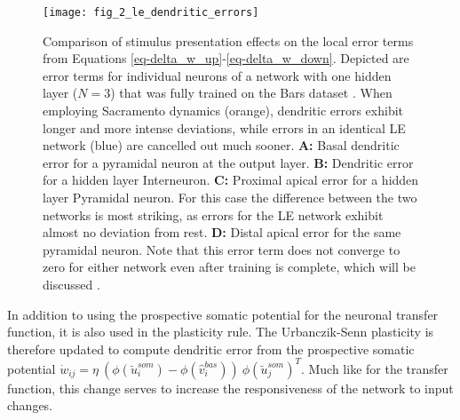 \begin{figure}
  \centering
  \texttt{[image: fig\_2\_le\_dendritic\_errors]}
  \caption{Comparison of stimulus presentation effects on the local error terms from Equations
    \ref{eq-delta_w_up}-\ref{eq-delta_w_down}. Depicted are error terms for individual neurons of a network with one
    hidden layer ($N=3$) that was fully trained on the Bars dataset . When employing Sacramento dynamics
    (orange), dendritic errors exhibit longer and more intense deviations, while errors in an identical LE network
    (blue) are cancelled out much sooner. \textbf{A:} Basal dendritic error for a pyramidal neuron at the output layer.
    \textbf{B:} Dendritic error for a hidden layer Interneuron. \textbf{C:} Proximal apical error for a hidden layer
    Pyramidal neuron. For this case the difference between the two networks is most striking, as errors for the LE
    network exhibit almost no deviation from rest. \textbf{D:} Distal apical error for the same pyramidal neuron. Note
    that this error term does not converge to zero for either network even after training is complete, which will be
    discussed .}
  \label{fig-error-comp-le}
\end{figure}

In addition to using the prospective  somatic potential for the neuronal transfer function, it is
also used in the plasticity rule. The Urbanczik-Senn plasticity is therefore updated to compute dendritic error from the
prospective somatic potential $\dot{w}_{ij}= \eta \ ( \phi(\breve{u}_i^{som}) - \phi(\hat{v}_i^{bas}) ) \
  \phi(\breve{u}_j^{som})^T$. Much like for the transfer function, this change serves to increase the responsiveness of
the network to input changes. \newline


